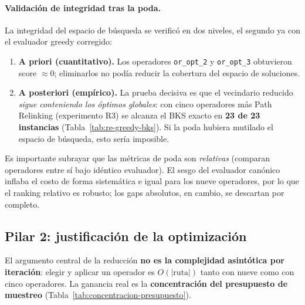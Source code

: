 \documentclass[11pt,a4paper]{article}
\theoremstyle{definition}
\theoremstyle{remark}
\begin{document}
\paragraph{Validación de integridad tras la poda.}
La integridad del espacio de búsqueda se verificó en dos niveles, el
segundo ya con el evaluador greedy corregido:

\begin{enumerate}
\item \textbf{A priori (cuantitativo).} Los operadores \texttt{or\_opt\_2}
  y \texttt{or\_opt\_3} obtuvieron score $\approx 0$; eliminarlos no podía
  reducir la cobertura del espacio de soluciones.
\item \textbf{A posteriori (empírico).} La prueba decisiva es que el
  vecindario reducido \emph{sigue conteniendo los óptimos globales}: con
  cinco operadores más Path Relinking (experimento R3) se alcanza el BKS
  exacto en \textbf{23 de 23 instancias} (Tabla~\ref{tab:re-greedy-bks}).
  Si la poda hubiera mutilado el espacio de búsqueda, esto sería imposible.
\end{enumerate}

\noindent Es importante subrayar que las métricas de poda son
\emph{relativas} (comparan operadores entre sí bajo idéntico evaluador). El
sesgo del evaluador canónico inflaba el costo de forma sistemática e igual
para los nueve operadores, por lo que el ranking relativo es robusto; los
gaps absolutos, en cambio, se descartan por completo.

\subsection{Pilar 2: justificación de la optimización}
\label{subsec:pilar-justificacion}

El argumento central de la reducción \textbf{no es la complejidad
asintótica por iteración}: elegir y aplicar un operador es
$O(|\text{ruta}|)$ tanto con nueve como con cinco operadores. La ganancia
real es la \textbf{concentración del presupuesto de muestreo}
(Tabla~\ref{tab:concentracion-presupuesto}).
\end{document}
